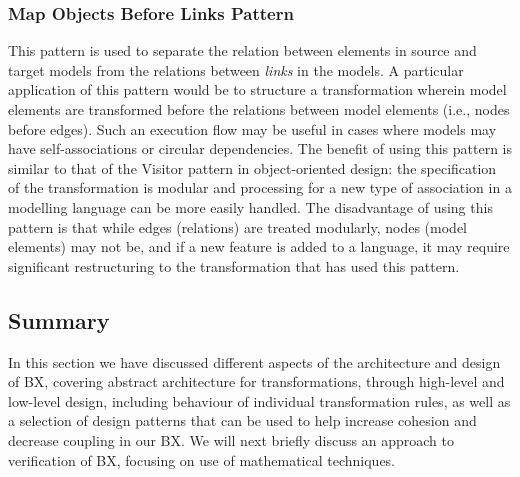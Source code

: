 \subsubsection{Map Objects Before Links Pattern}
This pattern is used to separate the relation between elements in source and target models from the relations between \textit{links} in the models. A particular application of this pattern would be to structure a transformation wherein model elements are transformed before the relations between model elements (i.e., nodes before edges). Such an execution flow may be useful in cases where models may have self-associations or circular dependencies. The benefit of using this pattern is similar to that of the Visitor pattern in object-oriented design: the specification of the transformation is modular and processing for a new type of association in a modelling language can be more easily handled. The disadvantage of using this pattern is that while edges (relations) are treated modularly, nodes (model elements) may not be, and if a new feature is added to a language, it may require significant restructuring to the transformation that has used this pattern.

\subsection{Summary}
In this section we have discussed different aspects of the architecture and design of BX, covering abstract architecture for transformations, through high-level and low-level design, including behaviour of individual transformation rules, as well as a selection of design patterns that can be used to help increase cohesion and decrease coupling in our BX. We will next briefly discuss an approach to verification of BX, focusing on use of mathematical techniques.